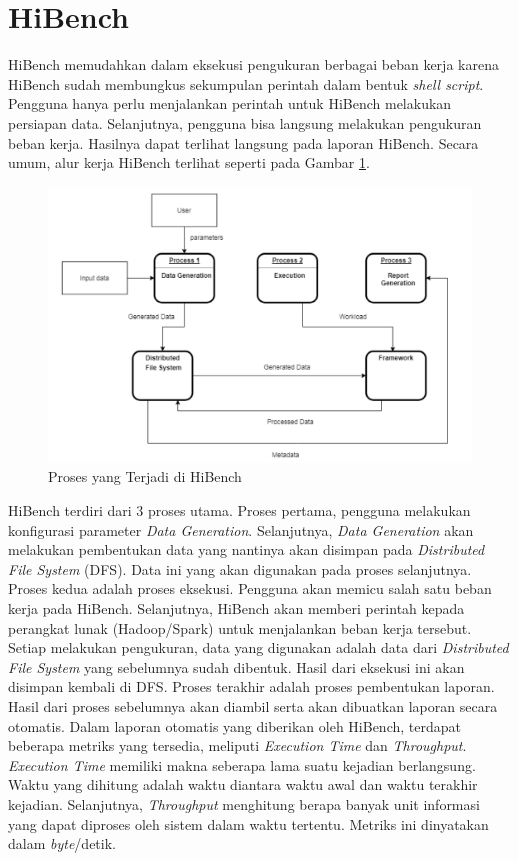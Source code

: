 \section{HiBench}
HiBench memudahkan dalam eksekusi pengukuran berbagai beban kerja karena HiBench sudah membungkus sekumpulan perintah dalam bentuk \textit{shell script}\cite{samadiPerformanceComparisonHadoop2018}. Pengguna hanya perlu menjalankan perintah untuk HiBench melakukan persiapan data. Selanjutnya, pengguna bisa langsung melakukan pengukuran beban kerja. Hasilnya dapat terlihat langsung pada laporan HiBench. Secara umum, alur kerja HiBench terlihat seperti pada Gambar \ref{fig:hibench-process-flow}.

\begin{figure}[h]
    \centering
    \includegraphics[width=1\textwidth]{figures/ch02/hibench-flow}
    \caption{Proses yang Terjadi di HiBench \cite{barosenAnalysisComparisonInterfacing2018}}
    \label{fig:hibench-process-flow}
\end{figure}

HiBench terdiri dari 3 proses utama. Proses pertama, pengguna melakukan konfigurasi parameter \textit{Data Generation}. Selanjutnya, \textit{Data Generation} akan melakukan pembentukan data yang nantinya akan disimpan pada \textit{Distributed File System} (DFS). Data ini yang akan digunakan pada proses selanjutnya. Proses kedua adalah proses eksekusi. Pengguna akan memicu salah satu beban kerja pada HiBench. Selanjutnya, HiBench akan memberi perintah kepada perangkat lunak (Hadoop/Spark) untuk menjalankan beban kerja tersebut. Setiap melakukan pengukuran, data yang digunakan adalah data dari \textit{Distributed File System} yang sebelumnya sudah dibentuk. Hasil dari eksekusi ini akan disimpan kembali di DFS. Proses terakhir adalah proses pembentukan laporan. Hasil dari proses sebelumnya akan diambil serta akan dibuatkan laporan secara otomatis.
Dalam laporan otomatis yang diberikan oleh HiBench, terdapat beberapa metriks yang tersedia, meliputi \textit{Execution Time} dan \textit{Throughput}. \textit{Execution Time} memiliki makna seberapa lama suatu kejadian berlangsung. Waktu yang dihitung adalah waktu diantara waktu awal dan waktu terakhir kejadian. Selanjutnya, \textit{Throughput} menghitung berapa banyak unit informasi yang dapat diproses oleh sistem dalam waktu tertentu. Metriks ini dinyatakan dalam \textit{byte}/detik.


